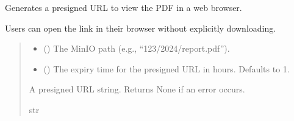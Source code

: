 \documentclass[letterpaper,10pt,english]{sphinxmanual}
\begin{document}
\begin{fulllineitems}
\begin{fulllineitems}
\begin{quote}
\begin{description}
\end{description}\end{quote}

\end{fulllineitems}


\begin{fulllineitems}
\label{\detokenize{src:src.db_utils.minio.MinioFileSystem.view_pdf}}
\pysigstartsignatures
{}
\pysigstopsignatures
\sphinxAtStartPar
Generates a presigned URL to view the PDF in a web browser.

\sphinxAtStartPar
Users can open the link in their browser without explicitly downloading.
\begin{quote}\begin{description}
\begin{itemize}
\item {} 
\sphinxAtStartPar
{} () \textendash{} The MinIO path (e.g., “123/2024/report.pdf”).

\item {} 
\sphinxAtStartPar
{} (\sphinxstyleliteralemphasis{\sphinxupquote{, }}) \textendash{} The expiry time for the presigned URL in hours. Defaults to 1.

\end{itemize}

\sphinxAtStartPar
A presigned URL string. Returns None if an error occurs.

\sphinxAtStartPar
str

\end{description}\end{quote}

\end{fulllineitems}



\end{fulllineitems}
\end{document}

